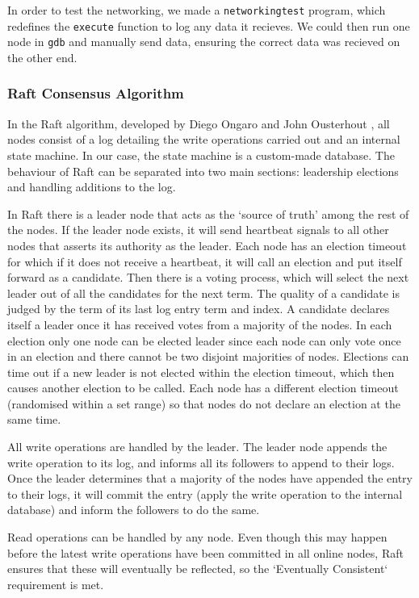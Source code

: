 \documentclass[11pt]{article}
\begin{document}
In order to test the networking, we made a \texttt{networkingtest} program, which redefines the \texttt{execute} function to log any data it recieves. We could then run one node in \texttt{gdb} and manually send data, ensuring the correct data was recieved on the other end.

\subsubsection{Raft Consensus Algorithm}

In the Raft algorithm, developed by Diego Ongaro and John Ousterhout \cite{RefWorks:ongaro2014search}, all nodes consist of a log detailing the write operations carried out and an internal state machine. In our case, the state machine is a custom-made database. The behaviour of Raft can be separated into two main sections: leadership elections and handling additions to the log.

In Raft there is a leader node that acts as the `source of truth' among the rest of the nodes. If the leader node exists, it will send heartbeat signals to all other nodes that asserts its authority as the leader. Each node has an election timeout for which if it does not receive a heartbeat, it will call an election and put itself forward as a candidate.
Then there is a voting process, which will select the next leader out of all the candidates for the next term. The quality of a candidate is judged by the term of its last log entry term and index. A candidate declares itself a leader once it has received votes from a majority of the nodes. In each election only one node can be elected leader since each node can only vote once in an election and there cannot be two disjoint majorities of nodes.
Elections can time out if a new leader is not elected within the election timeout, which then causes another election to be called. Each node has a different election timeout (randomised within a set range) so that nodes do not declare an election at the same time.

All write operations are handled by the leader. The leader node appends the write operation to its log, and informs all its followers to append to their logs. Once the leader determines that a majority of the nodes have appended the entry to their logs, it will commit the entry (apply the write operation to the internal database) and inform the followers to do the same.

Read operations can be handled by any node. Even though this may happen before the latest write operations have been committed in all online nodes, Raft ensures that these will eventually be reflected, so the `Eventually Consistent` requirement is met.
\end{document}

